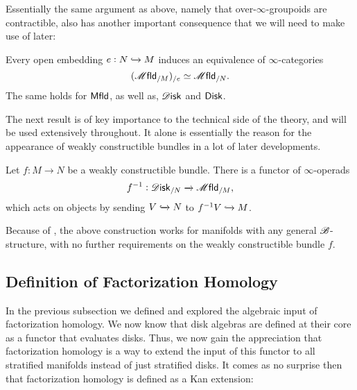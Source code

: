 \documentclass[../text]{subfiles}
\begin{document}
Essentially the same argument as above, namely that over-$\infty$-groupoids are contractible, also has another important consequence that we will need to make use of later:

\begin{lemma}\label{lem:double_slice}
    Every open embedding $e: N \xhookrightarrow{} M$ induces an equivalence of $\infty$-categories
    \begin{equation}
        (\mfld_{/M})_{/e} \simeq \mfld_{/N}.
    \end{equation}
    The same holds for $\mfld[r]$, as well as, $\disk$ and $\disk[r]$.
\end{lemma}

The next result is of key importance to the technical side of the theory, and will be used extensively throughout. It alone is essentially the reason for the appearance of weakly constructible bundles in a lot of later developments.

\begin{lemma}\label{lem:f^-1}
    Let $f: M \xrightarrow{} N$ be a weakly constructible bundle. There is a functor of $\infty$-operads
    \begin{equation}
        f^{-1}: \disk_{/N} \xrightarrow{} \mfld_{/M},
    \end{equation}
    which acts on objects by sending $V \xhookrightarrow{} N$ to $f^{-1}V \xhookrightarrow{} M$.
\end{lemma}

\begin{remark}
    Because of , the above construction works for manifolds with any general $\mathscr{B}$-structure, with no further requirements on the weakly constructible bundle $f$.
\end{remark}


\subsection{Definition of Factorization Homology}

In the previous subsection we defined and explored the algebraic input of factorization homology. We now know that disk algebras are defined at their core as a functor that evaluates disks. Thus, we now gain the appreciation that factorization homology is a way to extend the input of this functor to all stratified manifolds instead of just stratified disks. It comes as no surprise then that factorization homology is defined as a Kan extension:
\end{document}
